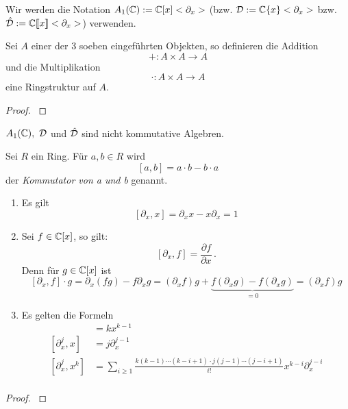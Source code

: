Wir werden die Notation $A_1(\mathbb{C}):=\mathbb{C}[x]<\partial_x>$ (bzw.
$\mathcal{D}:=\mathbb{C}\{x\}<\partial_x>$ bzw. 
$\hat{\mathcal{D}}:=\mathbb{C}\llbracket x\rrbracket<\partial_x>$) verwenden.

\begin{comment}
Beispiele und Alternative Definition:\\
Sergey-Arkhipov-MAT1191\_Lecture\_Notes.pdf Chapter 2.1
\end{comment}

\begin{lem} %
Sei $A$ einer der 3 soeben eingeführten Objekten, so definieren die Addition 
\[ +:A\times A \rightarrow A \]
und die Multiplikation
\[ \cdot:A\times A \rightarrow A \]
eine Ringstruktur auf $A$.
\end{lem}
\begin{proof}
\cite[Kapittel 2 Section 1]{ZulaBarbara}
\end{proof}

\begin{rem}
$A_1(\mathbb{C}),~\mathcal{D}$ und $\hat{\mathcal{D}}$ sind nicht kommutative Algebren.
\end{rem}

\begin{defn}[Kommutator]%
Sei $R$ ein Ring. Für $a,b\in R$ wird
\[[a,b]=a\cdot b-b\cdot a\]
der \emph{Kommutator von a und b} genannt.
\end{defn}

\begin{prop} %
\begin{enumerate}
\item Es gilt
\[[ \partial_x,x] = \partial_xx-x\partial_x=1 \]
\item Sei $f\in \mathbb{C}[x]$, so gilt:
\[ [\partial_x,f] = \frac{\partial f}{\partial x} \,. \]
Denn für $g\in \mathbb{C}[x]$ ist
\[
[\partial_x,f]\cdot g=\partial_x(fg)-f\partial_xg=
  (\partial_xf)g+\underset{=0}{\underbrace{ 
  f(\partial_xg)-f(\partial_xg)}}=
  (\partial_xf)g
\]
\item Es gelten die Formeln\\
\begin{align*}
[\partial_x,x^k]   &= kx^{k-1}\\
[\partial_x^j,x]   &= j\partial_x^{j-1}\\
[\partial_x^j,x^k] &= \sum_{i\geq1}\frac{k(k-1)\cdots(k-i+1)
  \cdot j(j-1)\cdots(j-i+1)}{i!}x^{k-i}\partial_x^{j-i} \\
\end{align*}
\end{enumerate}
\end{prop}
\begin{proof}
\cite{ZulaBarbara}
\end{proof}

